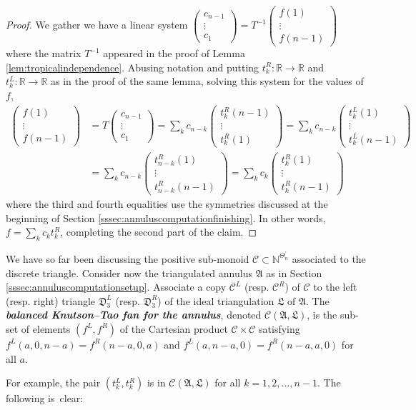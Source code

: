 \documentclass[12pt,
	]{amsart}
\theoremstyle{definition}
\newcommand{\mbb}[1]{\mathbb{#1}}
\newcommand{\mcal}[1]{\mathcal{#1}}
\newcommand{\mfrak}[1]{\mathfrak{#1}}
\newcommand{\lp}{\left(}\newcommand{\rp}{\right)}
\newcommand{\define}[1]{{\textit{\textbf{#1}}}}
\newcommand{\bmat}{\lp\begin{smallmatrix}}\newcommand{\emat}{\end{smallmatrix}\rp}
\newcommand{\nnegZ}{\mbb{N}}
\newcommand{\R}{\mbb{R}}
\newcommand{\ann}{\mfrak{A}}
\newcommand{\ttriang}{\mfrak{D}_3}
\newcommand{\idealtriang}{\mfrak{L}}
\newcommand{\discrete}{\Theta_n}
\newcommand{\cornerlessdiscrete}{\discrete^\prime}
\newcommand{\fan}{\mcal{C}}
\begin{document}
\begin{proof}
We gather we have a linear system $\bmat c_{n-1}\\\vdots\\c_1\emat=T^{-1}\bmat f(1)\\\vdots\\f({n-1})\emat$ where the matrix $T^{-1}$ appeared in the proof of Lemma \ref{lem:tropicalindependence}.  Abusing notation and putting $t^R_k:\R\to\R$ and $t^L_k:\R\to\R$ as in the proof of the same lemma, solving this system for the values of $f$, 
\begin{align*}
\bmat f(1)\\\vdots\\f({n-1})\emat
&=T\bmat c_{n-1}\\\vdots\\c_1\emat
=\sum_k c_{n-k}\bmat t^R_k(n-1)\\\vdots\\t^R_k(1)\emat
=\sum_k c_{n-k}\bmat t^L_k(1)\\\vdots\\t^L_k(n-1)\emat
\\&=\sum_k c_{n-k}\bmat t^R_{n-k}(1)\\\vdots\\t^R_{n-k}(n-1)\emat
=\sum_k c_k\bmat t^R_{k}(1)\\\vdots\\t^R_{k}(n-1)\emat
\end{align*}
where the third and fourth equalities use the symmetries discussed at the beginning of Section \ref{sssec:annuluscomputationfinishing}.  In other words, $f=\sum_k c_k t^R_k$, completing the second part of the claim.    
\end{proof}

We have so far been discussing the positive sub-monoid $\fan\subset\nnegZ^{\cornerlessdiscrete}$ associated to the discrete triangle.  Consider now the triangulated annulus $\ann$ as in Section {\upshape\ref{sssec:annuluscomputationsetup}}.  Associate a copy $\fan^L$ (resp. $\fan^R$) of $\fan$ to the left (resp. right) triangle $\ttriang^L$ (resp. $\ttriang^R$) of the ideal triangulation $\idealtriang$ of $\ann$.  The \define{balanced Knutson--Tao fan for the annulus}, denoted $\fan(\ann,\idealtriang)$, is the sub-set of elements $(f^L,f^R)$ of the Cartesian product $\fan\times\fan$ satisfying $f^L(a,0,n-a)=f^R(n-a,0,a)$ and $f^L(a,n-a,0)=f^R(n-a,a,0)$ for all $a$.  

For example, the pair $(t_k^L,t_k^R)$ is in $\fan(\ann,\idealtriang)$ for all $k=1,2,\dots,n-1$.  The following is~clear:
\end{document}
